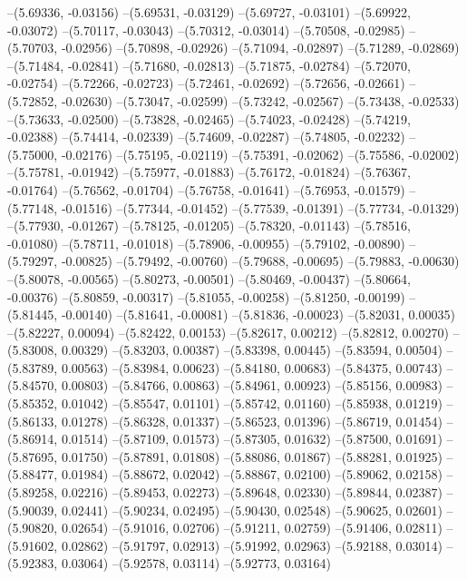 --(5.69336, -0.03156)
--(5.69531, -0.03129)
--(5.69727, -0.03101)
--(5.69922, -0.03072)
--(5.70117, -0.03043)
--(5.70312, -0.03014)
--(5.70508, -0.02985)
--(5.70703, -0.02956)
--(5.70898, -0.02926)
--(5.71094, -0.02897)
--(5.71289, -0.02869)
--(5.71484, -0.02841)
--(5.71680, -0.02813)
--(5.71875, -0.02784)
--(5.72070, -0.02754)
--(5.72266, -0.02723)
--(5.72461, -0.02692)
--(5.72656, -0.02661)
--(5.72852, -0.02630)
--(5.73047, -0.02599)
--(5.73242, -0.02567)
--(5.73438, -0.02533)
--(5.73633, -0.02500)
--(5.73828, -0.02465)
--(5.74023, -0.02428)
--(5.74219, -0.02388)
--(5.74414, -0.02339)
--(5.74609, -0.02287)
--(5.74805, -0.02232)
--(5.75000, -0.02176)
--(5.75195, -0.02119)
--(5.75391, -0.02062)
--(5.75586, -0.02002)
--(5.75781, -0.01942)
--(5.75977, -0.01883)
--(5.76172, -0.01824)
--(5.76367, -0.01764)
--(5.76562, -0.01704)
--(5.76758, -0.01641)
--(5.76953, -0.01579)
--(5.77148, -0.01516)
--(5.77344, -0.01452)
--(5.77539, -0.01391)
--(5.77734, -0.01329)
--(5.77930, -0.01267)
--(5.78125, -0.01205)
--(5.78320, -0.01143)
--(5.78516, -0.01080)
--(5.78711, -0.01018)
--(5.78906, -0.00955)
--(5.79102, -0.00890)
--(5.79297, -0.00825)
--(5.79492, -0.00760)
--(5.79688, -0.00695)
--(5.79883, -0.00630)
--(5.80078, -0.00565)
--(5.80273, -0.00501)
--(5.80469, -0.00437)
--(5.80664, -0.00376)
--(5.80859, -0.00317)
--(5.81055, -0.00258)
--(5.81250, -0.00199)
--(5.81445, -0.00140)
--(5.81641, -0.00081)
--(5.81836, -0.00023)
--(5.82031, 0.00035)
--(5.82227, 0.00094)
--(5.82422, 0.00153)
--(5.82617, 0.00212)
--(5.82812, 0.00270)
--(5.83008, 0.00329)
--(5.83203, 0.00387)
--(5.83398, 0.00445)
--(5.83594, 0.00504)
--(5.83789, 0.00563)
--(5.83984, 0.00623)
--(5.84180, 0.00683)
--(5.84375, 0.00743)
--(5.84570, 0.00803)
--(5.84766, 0.00863)
--(5.84961, 0.00923)
--(5.85156, 0.00983)
--(5.85352, 0.01042)
--(5.85547, 0.01101)
--(5.85742, 0.01160)
--(5.85938, 0.01219)
--(5.86133, 0.01278)
--(5.86328, 0.01337)
--(5.86523, 0.01396)
--(5.86719, 0.01454)
--(5.86914, 0.01514)
--(5.87109, 0.01573)
--(5.87305, 0.01632)
--(5.87500, 0.01691)
--(5.87695, 0.01750)
--(5.87891, 0.01808)
--(5.88086, 0.01867)
--(5.88281, 0.01925)
--(5.88477, 0.01984)
--(5.88672, 0.02042)
--(5.88867, 0.02100)
--(5.89062, 0.02158)
--(5.89258, 0.02216)
--(5.89453, 0.02273)
--(5.89648, 0.02330)
--(5.89844, 0.02387)
--(5.90039, 0.02441)
--(5.90234, 0.02495)
--(5.90430, 0.02548)
--(5.90625, 0.02601)
--(5.90820, 0.02654)
--(5.91016, 0.02706)
--(5.91211, 0.02759)
--(5.91406, 0.02811)
--(5.91602, 0.02862)
--(5.91797, 0.02913)
--(5.91992, 0.02963)
--(5.92188, 0.03014)
--(5.92383, 0.03064)
--(5.92578, 0.03114)
--(5.92773, 0.03164)

